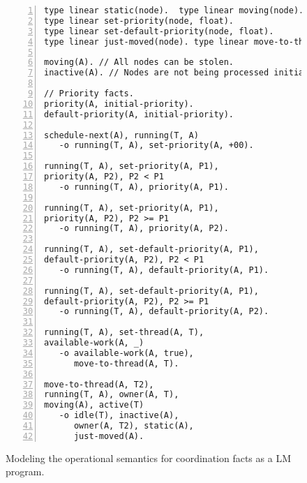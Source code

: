 \begin{figure}[h!]
\begin{Verbatim}[numbers=left,fontsize=\codesize,commandchars=*\#\&]
type linear static(node).  type linear moving(node).
type linear set-priority(node, float).
type linear set-default-priority(node, float).
type linear just-moved(node). type linear move-to-thread(node, thread).

moving(A). // All nodes can be stolen.
inactive(A). // Nodes are not being processed initially.

// Priority facts.
priority(A, initial-priority).
default-priority(A, initial-priority).

schedule-next(A), running(T, A)
   -o running(T, A), set-priority(A, +00).

running(T, A), set-priority(A, P1),
priority(A, P2), P2 < P1
   -o running(T, A), priority(A, P1).

running(T, A), set-priority(A, P1),
priority(A, P2), P2 >= P1
   -o running(T, A), priority(A, P2).

running(T, A), set-default-priority(A, P1),
default-priority(A, P2), P2 < P1
   -o running(T, A), default-priority(A, P1).

running(T, A), set-default-priority(A, P1),
default-priority(A, P2), P2 >= P1
   -o running(T, A), default-priority(A, P2).

running(T, A), set-thread(A, T),
available-work(A, _)
   -o available-work(A, true),
      move-to-thread(A, T).

move-to-thread(A, T2),
running(T, A), owner(A, T),
moving(A), active(T)
   -o idle(T), inactive(A),
      owner(A, T2), static(A),
      just-moved(A).
\end{Verbatim}
\caption{Modeling the operational semantics for coordination facts as a LM program.}
\label{code:threads:modeling_scheduling}
\end{figure}
